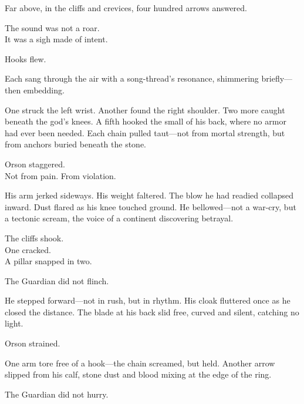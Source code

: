 \documentclass[12pt]{article}
\begin{document}
\vspace{0.5em}
Far above, in the cliffs and crevices, four hundred arrows answered.

\vspace{0.5em}
The sound was not a roar.\\
It was a sigh made of intent.

\vspace{0.5em}
Hooks flew.

\vspace{0.5em}
Each sang through the air with a song-thread’s resonance, shimmering briefly---then embedding.

\vspace{0.5em}
One struck the left wrist. Another found the right shoulder. Two more caught beneath the god’s knees. A fifth hooked the small of his back, where no armor had ever been needed. Each chain pulled taut---not from mortal strength, but from anchors buried beneath the stone.

\vspace{0.5em}
Orson staggered.\\
Not from pain. From violation.

\vspace{0.5em}
His arm jerked sideways. His weight faltered. The blow he had readied collapsed inward. Dust flared as his knee touched ground. He bellowed---not a war-cry, but a tectonic scream, the voice of a continent discovering betrayal.

\vspace{0.5em}
The cliffs shook.\\
One cracked.\\
A pillar snapped in two.

\vspace{0.5em}
The Guardian did not flinch.

\vspace{0.5em}
He stepped forward---not in rush, but in rhythm. His cloak fluttered once as he closed the distance. The blade at his back slid free, curved and silent, catching no light.

\vspace{0.5em}
Orson strained.

\vspace{0.5em}
One arm tore free of a hook---the chain screamed, but held. Another arrow slipped from his calf, stone dust and blood mixing at the edge of the ring.

\vspace{0.5em}
The Guardian did not hurry.
\end{document}
